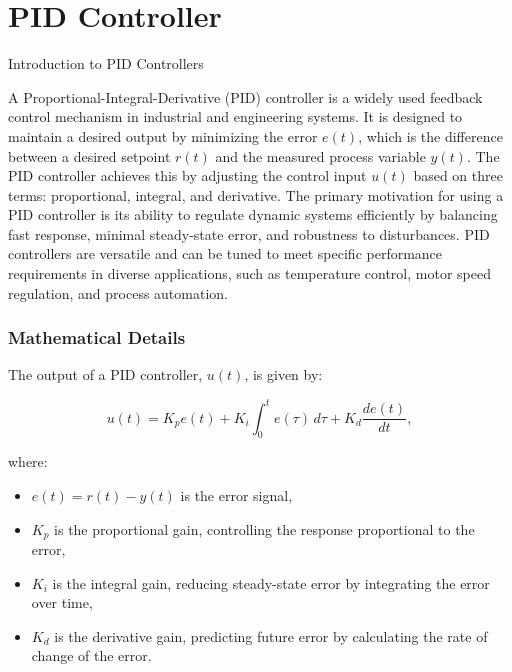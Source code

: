 \documentclass[../main.tex]{subfiles}
\begin{document}
	\chapter{PID Controller}
	
	
	
	\begin{section}{Introduction to PID Controllers}
	
	A Proportional-Integral-Derivative (PID) controller is a widely used feedback control mechanism in industrial and engineering systems. It is designed to maintain a desired output by minimizing the error \(e(t)\), which is the difference between a desired setpoint \(r(t)\) and the measured process variable \(y(t)\). The PID controller achieves this by adjusting the control input \(u(t)\) based on three terms: proportional, integral, and derivative.
	The primary motivation for using a PID controller is its ability to regulate dynamic systems efficiently by balancing fast response, minimal steady-state error, and robustness to disturbances. PID controllers are versatile and can be tuned to meet specific performance requirements in diverse applications, such as temperature control, motor speed regulation, and process automation.
	
	\subsection*{Mathematical Details}
	The output of a PID controller, \(u(t)\), is given by:
	
	\[
	u(t) = K_p e(t) + K_i \int_{0}^{t} e(\tau) \, d\tau + K_d \frac{d e(t)}{dt},
	\]
	
	where:
	\begin{itemize}
		\item \(e(t) = r(t) - y(t)\) is the error signal,
		\item \(K_p\) is the proportional gain, controlling the response proportional to the error,
		\item \(K_i\) is the integral gain, reducing steady-state error by integrating the error over time,
		\item \(K_d\) is the derivative gain, predicting future error by calculating the rate of change of the error.
	\end{itemize}
	

\end{section}
\end{document}
